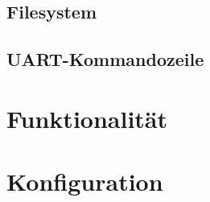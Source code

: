 \subsection{Filesystem}\label{subsec.sw_filesystem}

\subsection{UART-Kommandozeile}\label{subsec.sw_uart}

\section{Funktionalität}\label{sec.sw_funktionalitaet}

\section{Konfiguration}\label{sec.sw_konfiguration}
